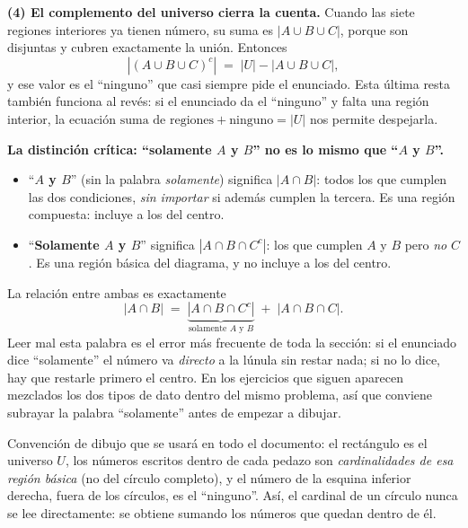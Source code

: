 \documentclass[11pt]{article}
\begin{document}
\begin{teo}
\medskip
\textbf{(4) El complemento del universo cierra la cuenta.} Cuando las siete regiones interiores ya tienen
número, su suma es $|A\cup B\cup C|$, porque son disjuntas y cubren exactamente la unión. Entonces
\[
|(A\cup B\cup C)^{c}| \;=\; |U| - |A\cup B\cup C|,
\]
y ese valor es el ``ninguno'' que casi siempre pide el enunciado. Esta última resta también funciona al
revés: si el enunciado da el ``ninguno'' y falta una región interior, la ecuación
$\text{suma de regiones} + \text{ninguno} = |U|$ nos permite despejarla.
\end{teo}

\begin{reg}
\textbf{La distinción crítica: ``solamente $A$ y $B$'' no es lo mismo que ``$A$ y $B$''.}

\begin{itemize}[leftmargin=1.4em]
\item ``\textbf{$A$ y $B$}'' (sin la palabra \emph{solamente}) significa $|A\cap B|$: todos los que
cumplen las dos condiciones, \emph{sin importar} si además cumplen la tercera. Es una región compuesta:
incluye a los del centro.
\item ``\textbf{Solamente $A$ y $B$}'' significa $|A\cap B\cap C^{c}|$: los que cumplen $A$ y $B$ pero
\emph{no} $C$. Es una región básica del diagrama, y no incluye a los del centro.
\end{itemize}
La relación entre ambas es exactamente
\[
|A\cap B| \;=\; \underbrace{|A\cap B\cap C^{c}|}_{\text{solamente }A\text{ y }B} \;+\; |A\cap B\cap C|.
\]
Leer mal esta palabra es el error más frecuente de toda la sección: si el enunciado dice ``solamente''
el número va \emph{directo} a la lúnula sin restar nada; si no lo dice, hay que restarle primero el centro.
En los ejercicios que siguen aparecen mezclados los dos tipos de dato dentro del mismo problema, así que
conviene subrayar la palabra ``solamente'' antes de empezar a dibujar.
\end{reg}

\begin{tip}
Convención de dibujo que se usará en todo el documento: el rectángulo es el universo $U$, los números
escritos dentro de cada pedazo son \emph{cardinalidades de esa región básica} (no del círculo completo),
y el número de la esquina inferior derecha, fuera de los círculos, es el ``ninguno''. Así, el cardinal de
un círculo nunca se lee directamente: se obtiene sumando los números que quedan dentro de él.
\end{tip}
\end{document}
